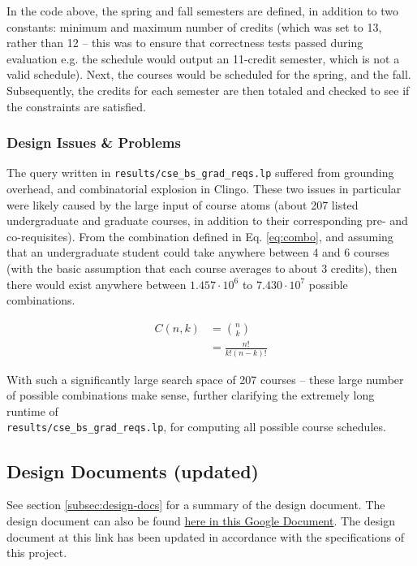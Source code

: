 \documentclass[12pt]{article}
\def \desDocLink{https://docs.google.com/document/d/1t48in8rdzC_VOijfAOP23C_YgAQxkow5eaE7AXEVUYM/edit?usp=sharing}
\begin{document}
    In the code above, the spring and fall semesters are defined, in addition to two constants: minimum and maximum number of credits (which was set to 13, rather than 12 -- this was to ensure that correctness tests passed during evaluation e.g. the schedule would output an 11-credit semester, which is not a valid schedule). Next, the courses would be scheduled for the spring, and the fall. Subsequently, the credits for each semester are then totaled and checked to see if the constraints are satisfied.


    \subsubsection{Design Issues \& Problems}
    \label{subsubsec:des-iss-probs}

    The query written in {\tt{results/cse\_bs\_grad\_reqs.lp}} suffered from grounding overhead, and combinatorial explosion in Clingo. These two issues in particular were likely caused by the large input of course atoms (about 207 listed undergraduate and graduate courses, in addition to their corresponding pre- and co-requisites). From the combination defined in Eq. \ref{eq:combo}, and assuming that an undergraduate student could take anywhere between 4 and 6 courses (with the basic assumption that each course averages to about 3 credits), then there would exist anywhere between $1.457 \cdot 10^6$ to $7.430 \cdot 10^7$ possible combinations.

    \begin{equation}
        \begin{aligned}
            C(n, k) & = \binom{n}{k} \\
            & =\frac{n!}{k!(n-k)!}
        \end{aligned}
        \label{eq:combo}
    \end{equation}

    With such a significantly large search space of 207 courses -- these large number of possible combinations make sense, further clarifying the extremely long runtime of \\ {\tt{results/cse\_bs\_grad\_reqs.lp}}, for computing all possible course schedules.

    \subsection{Design Documents (updated)}
    \label{subsec:des-doc-up}

    See section \ref{subsec:design-docs} for a summary of the design document. The design document can also be found \href{\desDocLink}{here in this Google Document}. The design document at this link has been updated in accordance with the specifications of this project.
\end{document}
